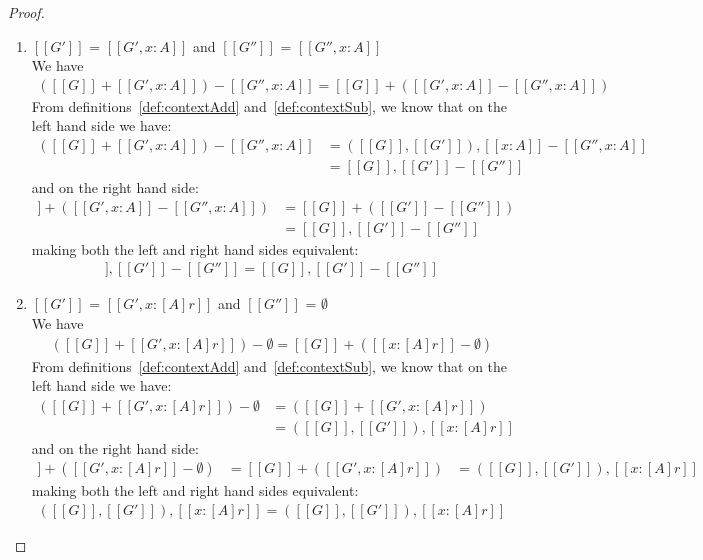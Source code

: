 \begin{proof}
\begin{enumerate}
    \item $[[G']]$ = $[[ G', x : A ]]$ and $[[G'']]$ = $[[G'', x : A]]$\\
      We have
      \begin{align*}
        ([[G]] + [[G', x : A]]) - [[G'', x : A]] = [[G]] + ([[G', x : A]] -
        [[G'', x : A]])
      \end{align*}
      From definitions~\ref{def:contextAdd} and~\ref{def:contextSub}, we know that
      on the left hand side we have:
      \begin{align*}
        ([[G]] + [[G', x : A]]) - [[G'', x : A]] &= ([[G]],[[G']]), [[x : A]] -
                                                   [[G'', x : A]] \\
                                                 &= [[G]], [[G']] - [[G'']]
      \end{align*}
      and on the right hand side:
      \begin{align*}
        [[G]] + ([[G', x : A]] - [[G'', x : A]]) &= [[G]] + ([[G']] - [[G'']]) \\
                                                &= [[G]], [[G']] - [[G'']]
      \end{align*}
      making both the left and right hand sides equivalent:
      \begin{align*}
        [[G]], [[G']] - [[G'']] = [[G]], [[G']] - [[G'']]
      \end{align*}

    \item $[[G']]$ = $[[ G', x : [A] r ]]$ and $[[G'']]$ = $\emptyset$\\
      We have
      \begin{align*}
        ([[G]] + [[G', x : [A] r]]) - \emptyset = [[G]] + ([[x : [A] r]] - \emptyset)
      \end{align*}
      From definitions~\ref{def:contextAdd} and~\ref{def:contextSub}, we know that
      on the left hand side we have:
      \begin{align*}
        ([[G]] + [[G', x : [A] r]]) - \emptyset &= ([[G]] + [[G', x : [A] r ]]) \\
                                            &= ([[G]], [[G']]), [[x : [A] r]]
      \end{align*}
      and on the right hand side:
      \begin{align*}
        [[G]] + ([[G', x : [A] r]] - \emptyset) &= [[G]] + ([[G', x : [A] r]])
                                            &= ([[G]],[[G']]),[[x : [A] r]]
      \end{align*}
      making both the left and right hand sides equivalent:
      \begin{align*}
        ([[G]],[[G']]),[[x : [A] r]] = ([[G]],[[G']]),[[x : [A] r]]
      \end{align*}



\end{enumerate}
\end{proof}
